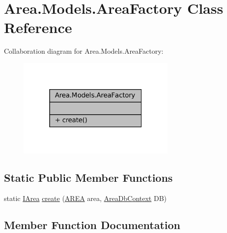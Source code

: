 \hypertarget{classArea_1_1Models_1_1AreaFactory}{}\section{Area.\+Models.\+Area\+Factory Class Reference}
\label{classArea_1_1Models_1_1AreaFactory}


Collaboration diagram for Area.\+Models.\+Area\+Factory\+:
\nopagebreak
\begin{figure}[H]
\begin{center}
\leavevmode
\includegraphics[width=220pt]{classArea_1_1Models_1_1AreaFactory__coll__graph}
\end{center}
\end{figure}
\subsection*{Static Public Member Functions}
\begin{DoxyCompactItemize}
\item 
static \mbox{\hyperlink{interfaceArea_1_1Models_1_1IArea}{I\+Area}} \mbox{\hyperlink{classArea_1_1Models_1_1AreaFactory_a39c7070acc78dddbde39b9e12df26c3d}{create}} (\mbox{\hyperlink{classArea_1_1Models_1_1AREA}{A\+R\+EA}} area, \mbox{\hyperlink{classArea_1_1DAT_1_1AreaDbContext}{Area\+Db\+Context}} DB)
\end{DoxyCompactItemize}


\subsection{Member Function Documentation}
\mbox{\label{classArea_1_1Models_1_1AreaFactory_a39c7070acc78dddbde39b9e12df26c3d}} 

